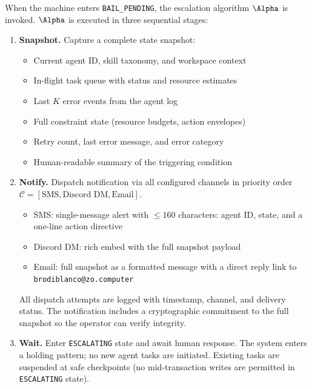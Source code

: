 When the machine enters \texttt{BAIL\_PENDING}, the escalation algorithm
$\Alpha$ is invoked.  $\Alpha$ is executed in three sequential stages:

\bigskip

\begin{algorithm}[H]
\caption{Escalation Algorithm $\Alpha$}
\label{alg:escalation}

\begin{enumerate}
  \item \textbf{Snapshot.}  Capture a complete state snapshot:
    \begin{itemize}
      \itemsep0pt
      \item Current agent ID, skill taxonomy, and workspace context
      \item In-flight task queue with status and resource estimates
      \item Last $K$ error events from the agent log
      \item Full constraint state (resource budgets, action envelopes)
      \item Retry count, last error message, and error category
      \item Human-readable summary of the triggering condition
    \end{itemize}

  \item \textbf{Notify.}  Dispatch notification via all configured channels
    in priority order $\mathcal{C} = [\text{SMS}, \text{Discord DM}, \text{Email}]$.
    \begin{itemize}
      \itemsep0pt
      \item SMS: single-message alert with $\leq 160$ characters: agent ID,
        state, and a one-line action directive
      \item Discord DM: rich embed with the full snapshot payload
      \item Email: full snapshot as a formatted message with a direct reply link
        to \texttt{brodiblanco@zo.computer}
    \end{itemize}
    All dispatch attempts are logged with timestamp, channel, and delivery
    status.  The notification includes a cryptographic commitment to the full
    snapshot so the operator can verify integrity.

  \item \textbf{Wait.}  Enter \texttt{ESCALATING} state and await human response.
    The system enters a holding pattern; no new agent tasks are initiated.
    Existing tasks are suspended at safe checkpoints (no mid-transaction writes
    are permitted in \texttt{ESCALATING} state).


\end{enumerate}
\end{algorithm}
